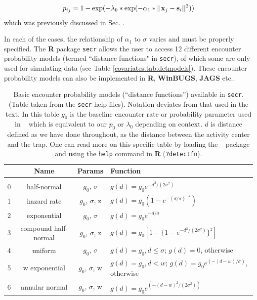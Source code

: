 \[
p_{ij} = 1-\exp(-\lambda_{0}* \exp(-\alpha_{1} *||{\bf x}_{j}-{\bf
  s}_{i}||^{2}) )
\]
which was previously discussed in Sec. \label{scr0.sec.binomial}.


In each of the cases, the relationship of $\alpha_1$ to $\sigma$ varies and must
be properly specified.  The {\bf R} package
{\tt secr} allows the user to access 12 different encounter probability models (termed ``distance
functions" in {\tt secr}), of which
some are only used for simulating data (see Table \ref{covariates.tab.detmodels}). These encounter
probability models can also be implemented in {\bf R}, {\bf WinBUGS},
{\bf JAGS} etc..


\begin{table}[ht]
\centering
\caption{
  Basic encounter probability models (``distance functions'')
 available in \mbox{\tt secr}.  (Table taken from
  the 
\mbox{\tt secr}
  help files). Notation deviates from that used in the text.
  In this table $g_{0}$ is the baseline encounter rate or probability
  parameter used in \secr~ which is equivalent to our $p_{0}$ or
  $\lambda_{0}$ depending on context. $d$ is distance defined as we have done throughout,
  as the distance between the activity center and the trap.
  One can read more on this specific table by loading the \secr~ package and using the
  {\tt help} command in {\bf R} ({\tt ?detectfn}).
}
\begin{tabular}{cccl}
\hline \hline
 & Name & Params & Function  \\ \hline
 \\
0 & half-normal &$g_0$, $\sigma$          &  $g(d) = g_0 e^{-d^2 / (2  \sigma^2)}$  \\
1 &hazard rate  & $g_0$, $\sigma$, z      &  $g(d) = g_0 (1 - e^{-(d / \sigma) ^{-z} })$ \\
2 &exponential   &$g_0$, $\sigma$    &  $g(d) = g_0 e^{- d / \sigma}$ \\
3 &compound half-normal  & $g_0$, $\sigma$, z & $g(d) = g_0 [1 - \{1 - e^{-d^2 /(2 \sigma^2)}\}^z]$ \\
4 &uniform     & $g_0$, $\sigma$     &
\parbox[t]{2in}{ $g(d) = g_{0}, d \leq \sigma$; \\
                 $g(d)= 0$, otherwise
} \\
5 &w exponential            & $g_0$, $\sigma$, w &
\parbox[t]{2in}{ $g(d) = g_{0}, d < w$; \\
                 $g(d) = g_{0} e^{(- (d - w) / \sigma)}$, otherwise
} \\
6 &annular normal           & $g_0$, $\sigma$, w & $g(d) = g_0 e^{(-(d-w)^2 / (2 \sigma^2))}$ \\

\end{tabular}
\end{table}
